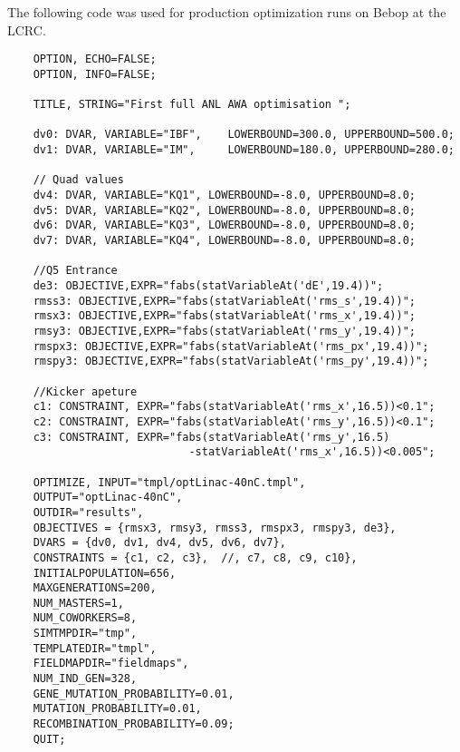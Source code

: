 \documentclass[table]{iitthesis}
\begin{document}

\label{3dmaps}


 \label{opt-tba-code}
The following code was used for production optimization runs on Bebop at the LCRC.
\makeatletter
\let\@currsize\normalsize
\makeatother 
\begin{singlespacing}
	\begin{verbatim}
	OPTION, ECHO=FALSE;
	OPTION, INFO=FALSE;
	
	TITLE, STRING="First full ANL AWA optimisation ";
	
	dv0: DVAR, VARIABLE="IBF",    LOWERBOUND=300.0, UPPERBOUND=500.0;
	dv1: DVAR, VARIABLE="IM",     LOWERBOUND=180.0, UPPERBOUND=280.0;
	
	// Quad values
	dv4: DVAR, VARIABLE="KQ1", LOWERBOUND=-8.0, UPPERBOUND=8.0;
	dv5: DVAR, VARIABLE="KQ2", LOWERBOUND=-8.0, UPPERBOUND=8.0;
	dv6: DVAR, VARIABLE="KQ3", LOWERBOUND=-8.0, UPPERBOUND=8.0;
	dv7: DVAR, VARIABLE="KQ4", LOWERBOUND=-8.0, UPPERBOUND=8.0;
	
	//Q5 Entrance
	de3: OBJECTIVE,EXPR="fabs(statVariableAt('dE',19.4))";
	rmss3: OBJECTIVE,EXPR="fabs(statVariableAt('rms_s',19.4))";
	rmsx3: OBJECTIVE,EXPR="fabs(statVariableAt('rms_x',19.4))";
	rmsy3: OBJECTIVE,EXPR="fabs(statVariableAt('rms_y',19.4))";
	rmspx3: OBJECTIVE,EXPR="fabs(statVariableAt('rms_px',19.4))";
	rmspy3: OBJECTIVE,EXPR="fabs(statVariableAt('rms_py',19.4))";
	
	//Kicker apeture
	c1: CONSTRAINT, EXPR="fabs(statVariableAt('rms_x',16.5))<0.1";
	c2: CONSTRAINT, EXPR="fabs(statVariableAt('rms_y',16.5))<0.1";
	c3: CONSTRAINT, EXPR="fabs(statVariableAt('rms_y',16.5)
							-statVariableAt('rms_x',16.5))<0.005";
	
	OPTIMIZE, INPUT="tmpl/optLinac-40nC.tmpl",
	OUTPUT="optLinac-40nC",
	OUTDIR="results",
	OBJECTIVES = {rmsx3, rmsy3, rmss3, rmspx3, rmspy3, de3},
	DVARS = {dv0, dv1, dv4, dv5, dv6, dv7},
	CONSTRAINTS = {c1, c2, c3},  //, c7, c8, c9, c10},
	INITIALPOPULATION=656,
	MAXGENERATIONS=200,
	NUM_MASTERS=1,
	NUM_COWORKERS=8,
	SIMTMPDIR="tmp",
	TEMPLATEDIR="tmpl",
	FIELDMAPDIR="fieldmaps",
	NUM_IND_GEN=328,
	GENE_MUTATION_PROBABILITY=0.01,
	MUTATION_PROBABILITY=0.01,
	RECOMBINATION_PROBABILITY=0.09;
	QUIT;
	\end{verbatim}	
\end{singlespacing}



\newpage
%
%


\end{document}
